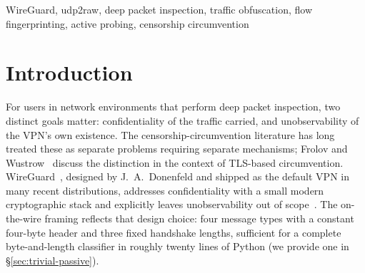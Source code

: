\documentclass[conference]{IEEEtran}
\begin{document}
\begin{IEEEkeywords}
WireGuard, udp2raw, deep packet inspection, traffic obfuscation,
flow fingerprinting, active probing, censorship circumvention
\end{IEEEkeywords}

\section{Introduction}

For users in network environments that perform deep packet inspection,
two distinct goals matter: confidentiality of the traffic carried, and
unobservability of the VPN's own existence. The
censorship-circumvention literature has long treated these as separate
problems requiring separate mechanisms; Frolov and
Wustrow~\cite{frolov2020probe} discuss the distinction in the context
of TLS-based circumvention. WireGuard~\cite{donenfeld2017}, designed
by J.\ A.\ Donenfeld and shipped as the default VPN in many recent
distributions, addresses confidentiality with a small modern
cryptographic stack and explicitly leaves unobservability out of
scope~\cite{wgknown}. The on-the-wire framing reflects that design
choice: four message types with a constant four-byte header and three
fixed handshake lengths, sufficient for a complete byte-and-length
classifier in roughly twenty lines of Python (we provide one in
\S\ref{sec:trivial-passive}).
\end{document}
